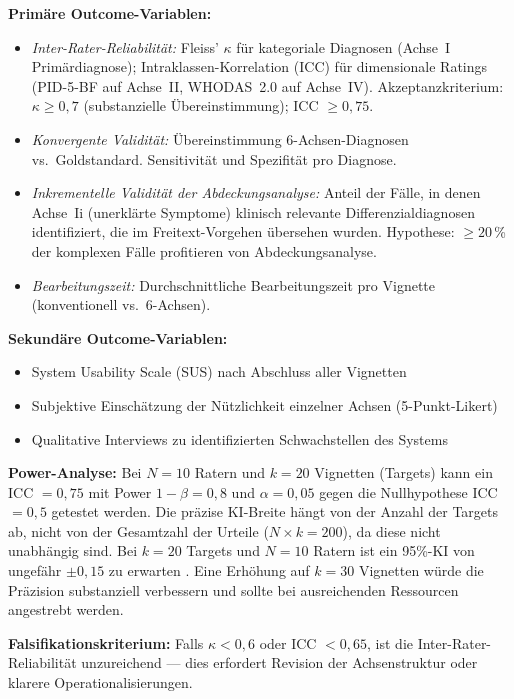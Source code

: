 \documentclass[11pt,a4paper]{article}
\begin{document}
\begin{description}[style=nextline, leftmargin=1.5cm, font=\bfseries]
\textbf{Prim\"are Outcome-Variablen:}
\begin{itemize}[leftmargin=*, noitemsep]
    \item \textit{Inter-Rater-Reliabilit\"at:} Fleiss' $\kappa$ f\"ur kategoriale Diagnosen (Achse~I Prim\"ardiagnose); Intraklassen-Korrelation (ICC) f\"ur dimensionale Ratings (PID-5-BF auf Achse~II, WHODAS~2.0 auf Achse~IV). Akzeptanzkriterium: $\kappa \geq 0{,}7$ (substanzielle \"Ubereinstimmung); ICC $\geq 0{,}75$.
    \item \textit{Konvergente Validit\"at:} \"Ubereinstimmung 6-Achsen-Diagnosen vs.\ Goldstandard. Sensitivit\"at und Spezifit\"at pro Diagnose.
    \item \textit{Inkrementelle Validit\"at der Abdeckungsanalyse:} Anteil der F\"alle, in denen Achse~Ii (unerkl\"arte Symptome) klinisch relevante Differenzialdiagnosen identifiziert, die im Freitext-Vorgehen \"ubersehen wurden. Hypothese: $\geq 20$\,\% der komplexen F\"alle profitieren von Abdeckungsanalyse.
    \item \textit{Bearbeitungszeit:} Durchschnittliche Bearbeitungszeit pro Vignette (konventionell vs.\ 6-Achsen).
\end{itemize}

\textbf{Sekund\"are Outcome-Variablen:}
\begin{itemize}[leftmargin=*, noitemsep]
    \item System Usability Scale (SUS) nach Abschluss aller Vignetten
    \item Subjektive Einsch\"atzung der N\"utzlichkeit einzelner Achsen (5-Punkt-Likert)
    \item Qualitative Interviews zu identifizierten Schwachstellen des Systems
\end{itemize}

\textbf{Power-Analyse:} Bei $N = 10$ Ratern und $k = 20$ Vignetten (Targets) kann ein ICC $= 0{,}75$ mit Power $1 - \beta = 0{,}8$ und $\alpha = 0{,}05$ gegen die Nullhypothese ICC $= 0{,}5$ getestet werden. Die pr\"azise KI-Breite h\"angt von der Anzahl der Targets ab, nicht von der Gesamtzahl der Urteile ($N \times k = 200$), da diese nicht unabh\"angig sind. Bei $k = 20$ Targets und $N = 10$ Ratern ist ein 95\%-KI von ungef\"ahr $\pm 0{,}15$ zu erwarten \citep{Shrout1979}. Eine Erh\"ohung auf $k = 30$ Vignetten w\"urde die Pr\"azision substanziell verbessern und sollte bei ausreichenden Ressourcen angestrebt werden.

\textbf{Falsifikationskriterium:} Falls $\kappa < 0{,}6$ oder ICC $< 0{,}65$, ist die Inter-Rater-Reliabilit\"at unzureichend --- dies erfordert Revision der Achsenstruktur oder klarere Operationalisierungen.


\end{description}
\end{document}
